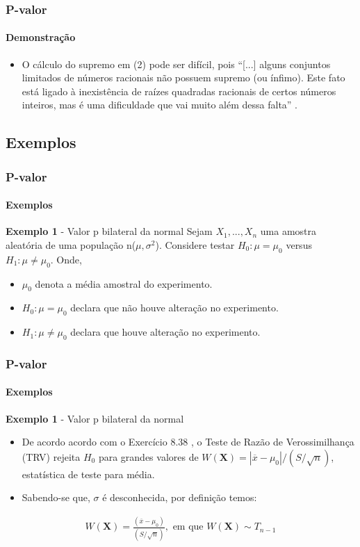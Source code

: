 \begin{frame}[c]
\frametitle{P-valor} 
\framesubtitle{Demonstração}
\begin{itemize}
    \justifying
    \item O cálculo do supremo em (2) pode ser difícil, pois ``[...] alguns conjuntos limitados de números racionais não possuem supremo (ou 
ínfimo). Este fato está ligado à inexistência de raízes quadradas racionais de certos números inteiros, mas é uma dificuldade que vai muito além dessa falta'' \cite[p.~78]{lima2019curso}.
\end{itemize}
\end{frame}

\begin{frame}[c] \section{Exemplos}
\frametitle{P-valor} 
\framesubtitle{Exemplos}
\begin{exampleblock}{\textbf{Exemplo 1} - Valor p bilateral da normal} %
Sejam $X_{1},...,X_{n}$ uma amostra aleatória de uma população n($\mu, \sigma^{2}$). Considere testar $H_0:\mu=\mu_0$ versus $H_1:\mu \neq \mu_0$. Onde,
\begin{itemize}
    \item $\mu_0$ denota a média amostral do experimento.
    \item $H_0:\mu=\mu_0$ declara que não houve alteração no experimento.
    \item $H_1:\mu \neq \mu_0$ declara que houve alteração no experimento.
\end{itemize}
\end{exampleblock}
\end{frame}

\begin{frame}[c]
\frametitle{P-valor} 
\framesubtitle{Exemplos}
\begin{exampleblock}{\textbf{Exemplo 1} - Valor p bilateral da normal} %

\begin{itemize}
    \item De acordo acordo com o Exercício 8.38 \cite[p.~408]{casella}, o Teste de Razão de Verossimilhança (TRV) rejeita $H_0$ para grandes valores de $W(\textbf{X})=|\overline{x}-\mu_0|/(S/\sqrt{n})$, estatística de teste para média.
    \item Sabendo-se que, $\sigma$ é desconhecida, por definição temos:
\end{itemize}
\begin{align*}
    W(\textbf{X})=\frac{(\overline{x}-\mu_0)}{(S/\sqrt{n})}, \text{ em que } W(\textbf{X}) \sim T_{n-1}
\end{align*}
\end{exampleblock}
\end{frame}

